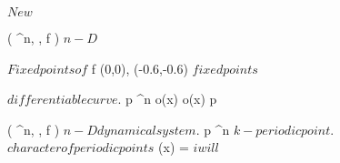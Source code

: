 \documentclass[../Main/main]{subfiles}
\begin{document}
\unit{ $ New $ }
{

	{
		{
		}
		{
		}
		\denote
		{
			( \R^n, \N, f ) $ n-D$
		}
	}
	
	
	{
		{
		}
		\study
		{
			$Fixed points of $ f
		}
		\demonstration
		{
			(0,0), (-0.6,-0.6) $ fixed points $
		}
	}
	
	
	{
		{
			\gamma $ differentiable curve $.
			p \in \R^n
		}
		{
			{
				o(x) \subset \gamma*
			}
		}
		{
			{
				o(x) \convergesto p
			}
		}
	}
	
	
	
	
	
	{
		{
			( \R^n, \N, f ) $ n-D dynamical system $.
			p \in \R^n $ k-periodic point $.
			\chi $ character of periodic points $
		}	
		\holds
		{
			\ex{ \sigma \in \im( \chi ) }
			{
				{
					\chi(x) = \sigma
				}
			}
		}
		\demonstration
		{
			$ i will $
		}
	}
	
	
	
	
}
\end{document}
